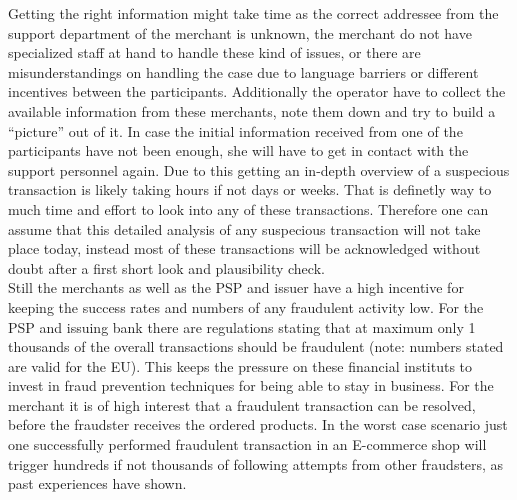 Getting the right information might take time as the correct addressee from the support department of the merchant is unknown, the merchant do not have specialized staff at hand to handle these kind of issues, or there are misunderstandings on handling the case due to language barriers or different incentives between the participants. Additionally the operator have to collect the available information from these merchants, note them down and try to build a ``picture'' out of it. In case the initial information received from one of the participants have not been enough, she will have to get in contact with the support personnel again. Due to this getting an in-depth overview of a suspecious transaction is likely taking hours if not days or weeks. That is definetly way to much time and effort to look into any of these transactions. Therefore one can assume that this detailed analysis of any suspecious transaction will not take place today, instead most of these transactions will be acknowledged without doubt after a first short look and plausibility check. \\

Still the merchants as well as the \gls{PSP} and issuer have a high incentive for keeping the success rates and numbers of any fraudulent activity low. For the \gls{PSP} and issuing bank there are regulations stating that at maximum only 1 thousands of the overall transactions should be fraudulent (note: numbers stated are valid for the EU). This keeps the pressure on these financial instituts to invest in fraud prevention techniques for being able to stay in business. For the merchant it is of high interest that a fraudulent transaction can be resolved, before the fraudster receives the ordered products. In the worst case scenario just one successfully performed fraudulent transaction in an E-commerce shop will trigger hundreds if not thousands of following attempts from other fraudsters, as past experiences have shown. \\


